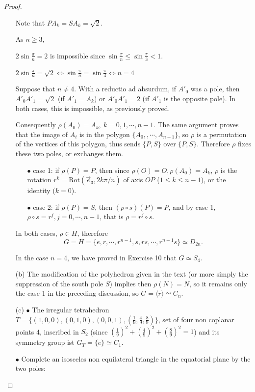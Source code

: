 \documentclass[11pt,a4paper]{article}
\newcommand{\be} {\begin{enumerate}}
\newcommand{\ee} {\end{enumerate}}
\begin{document}
\begin{proof}
\begin{enumerate}
Note that $P A_k = S A_k = \sqrt{2}$.

As $n\geq 3$,

$2 \sin \frac{\pi}{n} = 2$ is impossible since $\sin \frac{\pi}{n} \leq \sin \frac{\pi}{3} <1$.

$2 \sin  \frac{\pi}{n} =  \sqrt{2} \iff  \sin \frac{\pi}{n}  = \sin  \frac{\pi}{4} \iff n=4  $

Suppose that $n\neq 4$. With a reductio ad absurdum, if  $A'_0$ was a pole, then $A'_0A'_1 = \sqrt{2}$ (if $A'_1=A_k$) or $A'_0A'_1 = 2$ (if $A'_1$ is the opposite pole). In both cases, this is impossible, as previously proved.

Consequently $\rho(A_0) = A_k, \ k=0,1,\cdots,n-1$.
The same argument proves that the image of $A_i$ is in the polygon $\{A_0,,\cdots,A_{n-1}\}$, so $\rho$ is a permutation of the vertices of this polygon, thus sends $\{P,S\}$ over $\{P,S\}$. Therefore $\rho$ fixes these two poles, or exchanges them.

\be
\item[$\bullet$] case 1: if $\rho(P) = P$, then since $\rho(O) = O, \rho(A_0)= A_k$, 
$\rho$ is the rotation $r^k = \mathrm{Rot}(\vec{e}_3,  2k\pi/n)$ of axis $OP$ ($1\leq k \leq n-1$), or the identity ($k=0$).


\item[$\bullet$] case 2: if $\rho(P) = S$, then $(\rho \circ s)(P) = P$, and by case 1, $\rho \circ s = r^j, j=0,\cdots,n-1$, that is $\rho = r^j \circ s$.

\ee
In both cases, $\rho \in H$, therefore
$$G = H = \{e,r,\cdots,r^{n-1}, s, rs,\cdots, r^{n-1}s\} \simeq D_{2n}.$$

In the case $n=4$, we have proved in Exercise 10 that $G \simeq S_4$.

\item[(b)]
The modification of the polyhedron given in the text (or more simply the suppression of the south pole $S$) implies then $\rho(N) = N$, so it remains only the case 1 in the preceding discussion, so  $G = \langle r \rangle \simeq C_n$.

\item[(c)]
$\bullet$ The irregular tetrahedron  $T = \{(1,0,0), (0,1,0), (0,0,1), (\frac{1}{9},\frac{4}{9},\frac{8}{9})\}$, set of four non coplanar points 4, inscribed in $S_2$ (since $\left(\frac{1}{9}\right)^2 +\left(\frac{4}{9}\right)^2 +\left(\frac{8}{9}\right)^2  = 1$) and its symmetry group ist $G_T = \{e\}\simeq C_1$.

$\bullet$ Complete an isosceles non equilateral triangle  in the equatorial plane by the two poles: 


\end{enumerate}
\end{proof}
\end{document}
